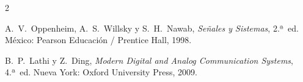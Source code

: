 \documentclass[11pt,a4paper]{article}
\begin{document}
\begin{thebibliography}{2}

A.~V.~Oppenheim, A.~S.~Willsky y S.~H.~Nawab, \emph{Señales y Sistemas}, 2.ª~ed. México: Pearson Educación / Prentice Hall, 1998.

B.~P.~Lathi y Z.~Ding, \emph{Modern Digital and Analog Communication Systems}, 4.ª~ed. Nueva York: Oxford University Press, 2009.

\end{thebibliography}
\end{document}
